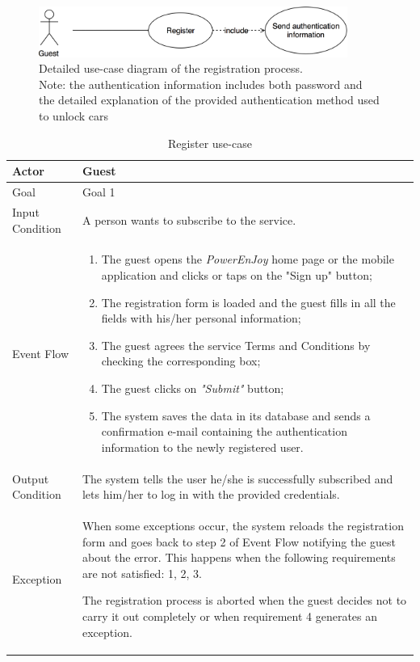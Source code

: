 \begin{figure}[H]
\begin{center}
		\includegraphics[width=0.9\textwidth]{./specific_requirements/features/diagrams/registration_proc_uc.png}
		\caption{Detailed use-case diagram of the registration process.\\Note: the authentication information includes both password and the detailed explanation of the provided authentication method used to unlock cars}
		\label{register_det_uc}
\end{center}
\end{figure}

\begin{table}[H]
\begin{center}
\begin{tabular}{p{} | p{}}
\hline
Actor & Guest\\
\hline
Goal & Goal 1\\
\hline
Input Condition & A person wants to subscribe to the service.\\
\hline
Event Flow & 
\begin{enumerate}
\item The guest opens the \emph{PowerEnJoy} home page or the mobile application and clicks or taps on the "Sign up" button;
\item The registration form is loaded and the guest fills in all the fields with his/her personal information;
\item The guest agrees the service Terms and Conditions by checking the corresponding box;
\item The guest clicks on \emph{"Submit"} button;
\item The system saves the data in its database and sends a confirmation e-mail containing the authentication information to the newly registered user.
\end{enumerate} \\
\hline
Output Condition & The system tells the user he/she is successfully subscribed and lets him/her to log in with the provided credentials.\\
\hline
Exception & When some exceptions occur, the system reloads the registration form and goes back to step 2 of Event Flow notifying the guest about the error. This happens when the following requirements are not satisfied: 1, 2, 3.

The registration process is aborted when the guest decides not to carry it out completely or when requirement 4 generates an exception.\\
\hline
\end{tabular}
\end{center}
\caption{Register use-case}
\label{register_uc}
\end{table}

